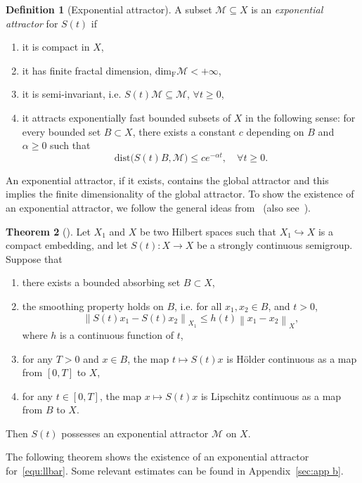 \documentclass[11pt, reqno]{amsart}
\theoremstyle{definition}
\newtheorem{theorem}{Theorem}[section]
\newtheorem{definition}[theorem]{Definition}
\numberwithin{equation}{section}
\newcommand{\norm}[2]{\left\|{#1}\right\|_{#2}}
\begin{document}
\begin{definition}[Exponential attractor]\label{def:exp att}
A subset $\mathcal{M}\subseteq X$ is an \emph{exponential attractor} for $S(t)$ if
\begin{enumerate}
	\item it is compact in $X$,
	\item it has finite fractal dimension, $\text{dim}_{\mathrm{F}} \mathcal{M} < +\infty$,
	\item it is semi-invariant, i.e. $S(t) \mathcal{M} \subseteq \mathcal{M}$, $\forall t\geq 0$,
	\item it attracts exponentially fast bounded subsets of $X$ in the following sense: for every bounded set $B\subset X$, there exists a constant $c$ depending on $B$ and $\alpha\geq 0$ such that
	\[
		\text{dist}\big(S(t)B, \mathcal{M}\big) \leq c e^{-\alpha t}, \quad \forall t\geq 0.
	\]
\end{enumerate}
\end{definition}

An exponential attractor, if it exists, contains the global attractor and this implies the finite dimensionality of the global attractor.
To show the existence of an exponential attractor, we follow the general ideas from~\cite{MirZel08} (also see~\cite{Pie18}).

\begin{theorem}[\cite{Pie18}]\label{the:cond exp att}
Let $X_1$ and $X$ be two Hilbert spaces such that $X_1\hookrightarrow X$ is a compact embedding, and let $S(t): X \to X$ be a strongly continuous semigroup.
Suppose that
\begin{enumerate}
    \item there exists a bounded absorbing set $B\subset X$,
	\item the smoothing property holds on $B$, i.e. for all $x_1,x_2\in B$, and $t>0$,
	\[
		\norm{S(t)x_1 - S(t)x_2}{X_1} \leq h(t) \norm{x_1-x_2}{X},
	\]
	where $h$ is a continuous function of $t$,
	\item for any $T>0$ and $x\in B$, the map $t \mapsto S(t)x$ is H\"older continuous as a map from $[0,T]$ to $X$,
	\item for any $t\in [0,T]$, the map $x \mapsto S(t)x$ is Lipschitz continuous as a map from $B$ to $X$.
\end{enumerate}
Then $S(t)$ possesses an exponential attractor $\mathcal{M}$ on $X$.
\end{theorem}

The following theorem shows the existence of an exponential attractor for~\eqref{equ:llbar}. Some relevant estimates can be found in Appendix~\ref{sec:app b}.
\end{document}
